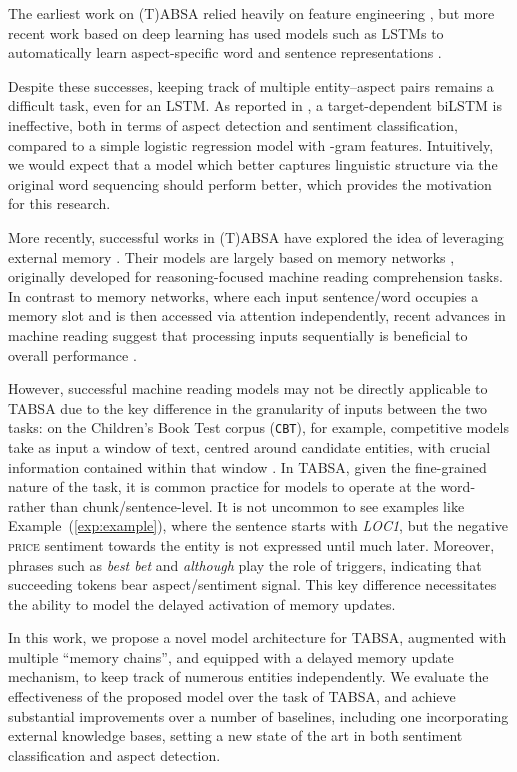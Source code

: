 \documentclass[11pt,a4paper]{article}
\newcommand{\lex}[1]{\textit{#1}\xspace}
\newcommand{\aspect}[1]{\textsc{#1}\xspace}
\newcommand{\system}[2][]{\texttt{#2#1}\xspace}
\newcommand{\exref}[2][]{Example#1~(\ref{#2})\xspace}
\newcommand{\cbt}{\system{CBT}}
\begin{document}
The earliest work on (T)ABSA relied heavily on feature engineering \cite{Wagner+:2014,Kiritchenko+:2014}, but more recent work based on deep learning has used models such as LSTMs to automatically learn aspect-specific word and sentence representations \cite{Tang+:2016b}.

Despite these successes, keeping track of multiple entity--aspect pairs remains a difficult task, even for an LSTM. As reported in , a target-dependent biLSTM is ineffective, both in terms of aspect detection and sentiment classification, compared to a simple logistic regression model with -gram features. Intuitively, we would expect that a model which better captures linguistic structure via the original word sequencing should perform better, which provides the motivation for this research.

More recently, successful works in (T)ABSA have explored the idea of leveraging external memory \cite{Tang+:2016,Chen+:2017}. Their models are largely based on memory networks \cite{Weston+:2015}, originally developed for reasoning-focused machine reading comprehension tasks. In contrast to memory networks, where each input sentence/word occupies a memory slot and is then accessed via attention independently, recent advances in machine reading suggest that processing inputs sequentially is beneficial to overall performance \cite{Seo+:2017,Mikael+:2017}.

However, successful machine reading models may not be directly applicable to TABSA due to the key difference in the granularity of inputs between the two tasks: on the Children's Book Test corpus (\cbt), for example, competitive models take as input a window of text, centred around candidate entities, with crucial information contained within that window \cite{Hill+:2015,Mikael+:2017}. In TABSA, given the fine-grained nature of the task, it is common practice for models to operate at the word- rather than chunk/sentence-level. It is not uncommon to see examples like \exref{exp:example}, where the sentence starts with \lex{LOC1}, but the negative \aspect{price} sentiment towards the entity is not expressed until much later. 
Moreover, phrases such as \lex{best bet} and \lex{although} play the role of triggers, indicating that succeeding tokens bear aspect/sentiment signal.
This key difference necessitates the ability to model the delayed activation of memory updates.

In this work, we propose a novel model architecture for TABSA, augmented with multiple ``memory chains'', and equipped with a delayed memory update mechanism, to keep track of numerous entities independently.
We evaluate the effectiveness of the proposed model over the task of TABSA, and achieve substantial improvements over a number of
baselines, including one incorporating external knowledge bases, setting a new state of the art in both sentiment classification
and aspect detection.
\end{document}
